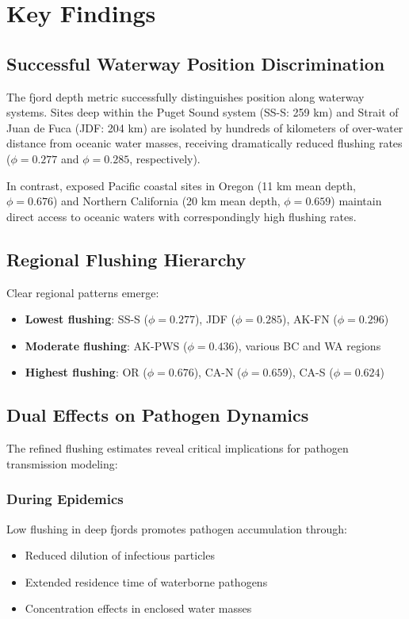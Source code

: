 \documentclass[11pt,a4paper]{article}
\begin{document}
\section{Key Findings}

\subsection{Successful Waterway Position Discrimination}

The fjord depth metric successfully distinguishes position along waterway systems. Sites deep within the Puget Sound system (SS-S: 259 km) and Strait of Juan de Fuca (JDF: 204 km) are isolated by hundreds of kilometers of over-water distance from oceanic water masses, receiving dramatically reduced flushing rates ($\phi = 0.277$ and $\phi = 0.285$, respectively).

In contrast, exposed Pacific coastal sites in Oregon (11 km mean depth, $\phi = 0.676$) and Northern California (20 km mean depth, $\phi = 0.659$) maintain direct access to oceanic waters with correspondingly high flushing rates.

\subsection{Regional Flushing Hierarchy}

Clear regional patterns emerge:

\begin{itemize}
    \item \textbf{Lowest flushing}: SS-S ($\phi = 0.277$), JDF ($\phi = 0.285$), AK-FN ($\phi = 0.296$)
    \item \textbf{Moderate flushing}: AK-PWS ($\phi = 0.436$), various BC and WA regions
    \item \textbf{Highest flushing}: OR ($\phi = 0.676$), CA-N ($\phi = 0.659$), CA-S ($\phi = 0.624$)
\end{itemize}

\subsection{Dual Effects on Pathogen Dynamics}

The refined flushing estimates reveal critical implications for pathogen transmission modeling:

\subsubsection{During Epidemics}
Low flushing in deep fjords promotes pathogen accumulation through:
\begin{itemize}
    \item Reduced dilution of infectious particles
    \item Extended residence time of waterborne pathogens
    \item Concentration effects in enclosed water masses
\end{itemize}
\end{document}
